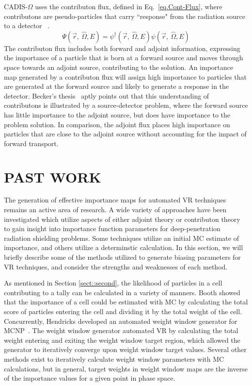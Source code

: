 \documentclass[12pt]{article}
\begin{document}
CADIS-$\Omega$ uses the contributon flux, defined in Eq.~\eqref{eq.Cont-Flux}, where contributons are pseudo-particles that carry ``response" from the radiation source to a detector ~\cite{williams_generalized_1991,williams_contributorn_1992,williams_contributon_study}. 
\begin{equation}
\Psi (\vec {r},\:\hat\Omega ,E) = \psi^{\dagger} (\vec {r},\:\hat\Omega ,E) \psi(\vec {r} ,\:\hat\Omega,E)
\label{eq.Cont-Flux} 
\end{equation}
The contributon flux includes both forward and adjoint information, expressing the importance of a particle that is born at a forward source and moves through space towards an adjoint source, contributing to the solution.
An importance map generated by a contributon flux will assign high importance to particles that are generated at the forward source and likely to generate a response in the detector. 
Becker's thesis~\cite{becker_hybrid_2009} aptly points out that this understanding of contributons is illustrated by a source-detector problem, where the forward source has little importance to the adjoint source, but does have importance to the problem solution.
In comparison, the adjoint flux places high importance on particles that are close to the adjoint source without accounting for the impact of forward transport. 

\section{PAST WORK}
\label{sect::past}

The generation of effective importance maps for automated VR techniques remains an active area of research. A wide variety of approaches have been investigated which utilize aspects of either adjoint theory or contributon theory to gain insight into importance function parameters for deep-penetration radiation shielding problems. Some techniques utilize an initial MC estimate of importance, and others utilize a determinstic calculation. In this section, we will briefly describe some of the methods utilized to generate biasing parameters for VR techniques, and consider the strengths and weaknesses of each method.

As mentioned in Section \ref{sect::second}, the likelihood of particles in a cell contributing to a tally can be calculated in a variety of manners. Booth \cite{booth_automatic_1982} showed that the importance of a cell could be estimated with MC by calculating the total score of particles entering the cell and dividing it by the total weight of the cell. Concurrently, Hendricks \cite{hendricks_code-generated_1982} developed an automated weight window generator for MCNP~\cite{brown_mcnp_2002}. The weight window generator automated VR by calculating the total weight entering and exiting the weight window target region, which allowed the generator to iteratively converge upon weight window target values. Several other methods exist to iteratively calculate weight window parameters with MC calculations, but in general, target weights in weight window maps are the inverse of the importance values for a given point in phase space.
\end{document}
